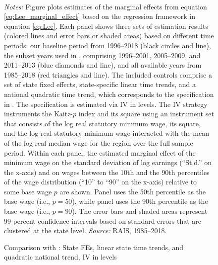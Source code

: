 \begin{figure}[!htb]
  \centering
  \caption{Comparison with \citet{Haanwinckel2020_appendix}: State FEs, linear state time trends, and quadratic national trend, IV in levels\label{app_fig_haanwinckel_state_trend_1_ntrend_2_iv_levels}}
  \prefigvspace
  \hspace*{\fill}%
  \centerhfill[\qquad\qquad\qquad\qquad\qquad]
  \hspace*{\fill}
  \\
  \postfigvspace
  \begin{minipage}[t]{1\columnwidth}%
    \begin{spacing}{0.75}
      \emph{\scriptsize{}Notes:}{\scriptsize{} Figure plots estimates of the marginal effects from equation \eqref{eq:Lee_marginal_effect} based on the regression framework in equation \eqref{eq:Lee}. Each panel shows three sets of estimation results (colored lines and error bars or shaded areas) based on different time periods: our baseline period from 1996--2018 (black circles and line), the subset years used in , comprising 1996--2001, 2005--2009, and 2011--2013 (blue diamonds and line), and all available years from 1985--2018 (red triangles and line). The included controls comprise a set of state fixed effects, state-specific linear time trends, and a national quadratic time trend, which corresponds to the specification in . The specification is estimated via IV in levels. The IV strategy instruments the Kaitz-$p$ index and its square using an instrument set that consists of the log real statutory minimum wage, its square, and the log real statutory minimum wage interacted with the mean of the log real median wage for the region over the full sample period. Within each panel, the estimated marginal effect of the minimum wage on the standard deviation of log earnings (``St.d.'' on the x-axis) and on wages between the 10th and the 90th percentiles of the wage distribution (``10'' to ``90'' on the x-axis) relative to some base wage $p$ are shown. Panel  uses the 50th percentile as the base wage (i.e., $p=50$), while panel  uses the 90th percentile as the base wage (i.e., $p=90$). The error bars and shaded areas represent 99 percent confidence intervals based on standard errors that are clustered at the state level. %
      \emph{\scriptsize{}Source: } RAIS, 1985--2018.}
    \end{spacing}
  \end{minipage}
\end{figure}


